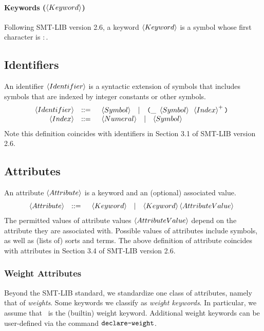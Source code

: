 \documentclass[english,a4paper,10pt]{article}
\begin{document}
\paragraph{Keywords ($\left\langle Keyword\right\rangle$)}
Following SMT-LIB version 2.6,
a keyword $\left\langle Keyword\right\rangle$ is a symbol whose first character is $:$.

\subsection{Identifiers}

An identifier $\left\langle Identifier\right\rangle$
is a syntactic extension of symbols 
that includes symbols that are indexed by integer constants or other symbols.
\[
\begin{array}{rcl}
\left\langle Identifier\right\rangle & ::= & \begin{array}{ccc}
\left\langle Symbol\right\rangle & | & \texttt{(}{\tt \_}\mbox{ }\left\langle Symbol\right\rangle\mbox{ }\left\langle Index\right\rangle^{+}\texttt{)}
\end{array}\\
\left\langle Index\right\rangle & ::= & \begin{array}{ccc}
\left\langle Numeral\right\rangle & | & \left\langle Symbol\right\rangle
\end{array}\\
\end{array}
\]
Note this definition coincides with
identifiers in Section 3.1 of SMT-LIB version 2.6.

\subsection{Attributes}

An attribute $\left\langle Attribute\right\rangle$
is a keyword and an (optional) associated value.
\[
\begin{array}{rcl}
\left\langle Attribute\right\rangle & ::= & \begin{array}{ccc}
\left\langle Keyword\right\rangle & | & \left\langle Keyword\right\rangle \left\langle AttributeValue\right\rangle
\end{array}\\
\end{array}
\]
The permitted values of attribute values $\left\langle AttributeValue\right\rangle$ depend on the attribute
they are associated with.
Possible values of attributes include symbols, as well as (lists of) sorts and terms.
The above definition of attribute coincides with
attributes in Section 3.4 of SMT-LIB version 2.6.

\subsubsection{Weight Attributes}
\label{sec:weight-attributes}
Beyond the SMT-LIB standard, we standardize one class of attributes, namely that of \emph{weights}.
Some keywords we classify as \emph{weight keywords}.
In particular, we assume that \kweight\ is the (builtin) weight keyword.
Additional weight keywords can be user-defined via the command $\texttt{declare-weight}$.
\end{document}
